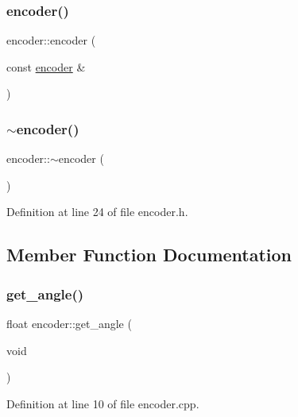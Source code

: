 \subsubsection{\texorpdfstring{encoder()}{encoder()}\hspace{0.1cm}{\footnotesize\ttfamily [4/4]}}
{\footnotesize\ttfamily encoder\+::encoder (\begin{DoxyParamCaption}\item[{const \mbox{\hyperlink{classencoder}{encoder}} \&}]{ }\end{DoxyParamCaption})\hspace{0.3cm}{\ttfamily [default]}}

\mbox{\label{classencoder_aa3b6033758cc93ea194c4b635c9547d6}} 
\subsubsection{\texorpdfstring{$\sim$encoder()}{~encoder()}}
{\footnotesize\ttfamily encoder\+::$\sim$encoder (\begin{DoxyParamCaption}{ }\end{DoxyParamCaption})\hspace{0.3cm}{\ttfamily [inline]}}



Definition at line 24 of file encoder.\+h.



\subsection{Member Function Documentation}
\mbox{\label{classencoder_aba5b6ccdb374d7fcc5d9f2abab1a59da}} 
\subsubsection{\texorpdfstring{get\_angle()}{get\_angle()}}
{\footnotesize\ttfamily float encoder\+::get\+\_\+angle (\begin{DoxyParamCaption}\item[{void}]{ }\end{DoxyParamCaption})}



Definition at line 10 of file encoder.\+cpp.

